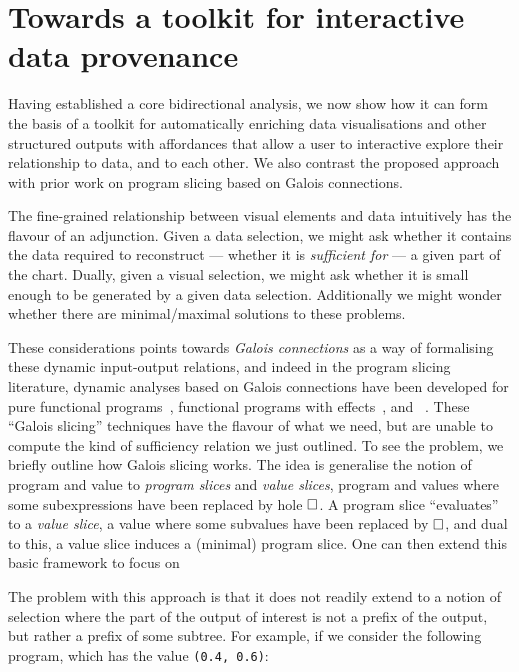 \section{Towards a toolkit for interactive data provenance}
\label{sec:toolkit}

Having established a core bidirectional analysis, we now show how it can form the basis of a toolkit for automatically enriching data visualisations and other structured outputs with affordances that allow a user to interactive explore their relationship to data, and to each other. We also contrast the proposed approach with prior work on program slicing based on Galois connections.


%

The fine-grained relationship between visual elements and data intuitively has the flavour of an adjunction. Given a data selection, we might ask whether it contains the data required to reconstruct --- whether it is \emph{sufficient for} --- a given part of the chart. Dually, given a visual selection, we might ask whether it is small enough to be generated by a given data selection. Additionally we might wonder whether there are minimal/maximal solutions to these problems.

These considerations points towards \emph{Galois connections} as a way of formalising these dynamic input-output relations, and indeed in the program slicing literature, dynamic analyses based on Galois connections have been developed for pure functional programs~\cite{perera12a}, functional programs with effects~\cite{ricciotti17}, and \piCalculus~\cite{perera16d}. These ``Galois slicing'' techniques have the flavour of what we need, but are unable to compute the kind of sufficiency relation we just outlined. To see the problem, we briefly outline how Galois slicing works. The idea is generalise the notion of program and value to \emph{program slices} and \emph{value slices}, program and values where some subexpressions have been replaced by hole $\square$. A program slice ``evaluates'' to a \emph{value slice}, a value where some subvalues have been replaced by $\square$, and dual to this, a value slice induces a (minimal) program slice. One can then extend this basic framework to focus on

The problem with this approach is that it does not readily extend to a notion of selection where the part of the output of interest is not a prefix of the output, but rather a prefix of some subtree. For example, if we consider the following program, which has the value \lstinline{(0.4, 0.6)}:

